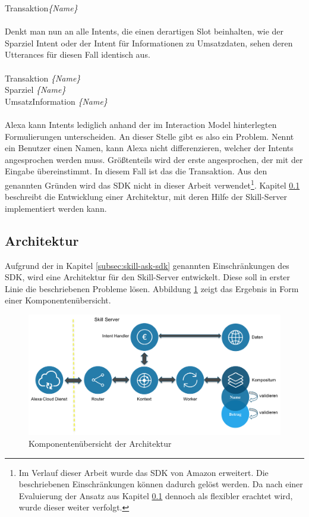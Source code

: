 Transaktion\textit{\{Name\}}\\\\
Denkt man nun an alle Intents, die einen derartigen Slot beinhalten, wie \zB der Sparziel Intent oder der Intent für Informationen zu Umsatzdaten, sehen deren Utterances für diesen Fall identisch aus.\\\\
    Transaktion \textit{\{Name\}}\\
    Sparziel \textit{\{Name\}}\\
    UmsatzInformation \textit{\{Name\}}\\\\
Alexa kann Intents lediglich anhand der im Interaction Model hinterlegten Formulierungen unterscheiden. An dieser Stelle gibt es also ein Problem. Nennt ein Benutzer einen Namen, kann Alexa nicht differenzieren, welcher der Intents angesprochen werden muss. Größtenteils wird der erste angesprochen, der mit der Eingabe übereinstimmt. In diesem Fall ist das die Transaktion. Aus den genannten Gründen wird das \ac{SDK} nicht in dieser Arbeit verwendet\footnote{Im Verlauf dieser Arbeit wurde das \ac{SDK} von Amazon erweitert. Die beschriebenen Einschränkungen können dadurch gelöst werden. Da nach einer Evaluierung der Ansatz aus Kapitel \ref{subsec:skill-architektur} dennoch als flexibler erachtet wird, wurde dieser weiter verfolgt.}. Kapitel \ref{subsec:skill-architektur} beschreibt die Entwicklung einer Architektur, mit deren Hilfe der Skill-Server implementiert werden kann.

\subsection{Architektur}
\label{subsec:skill-architektur}
Aufgrund der in Kapitel \ref{subsec:skill-ask-sdk} genannten Einschränkungen des \ac{SDK}, wird eine Architektur für den Skill-Server entwickelt. Diese soll in erster Linie die beschriebenen Probleme lösen. Abbildung \ref{fig:skill-architektur-komponenten} zeigt das Ergebnis in Form einer Komponentenübersicht.

\begin{figure}[!htb]
    \centering
    \includegraphics[width=1.0\textwidth]{bilder/4_skillArchitektur.png}
    \caption{Komponentenübersicht der Architektur}
    \label{fig:skill-architektur-komponenten}
\end{figure}

